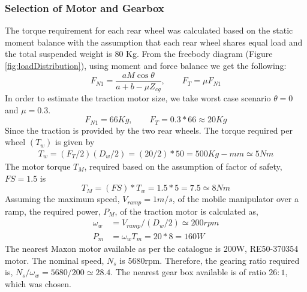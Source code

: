  \subsubsection {Selection of Motor and Gearbox}
 The torque requirement for each rear wheel was calculated based on the static moment balance with the assumption that each rear wheel shares equal load and the total suspended weight is 80 Kg. From the freebody diagram (Figure   \ref{fig:loadDistribution}), using moment and force balance  we get the following:
\begin{equation}
\label{eqn:t1}
F_{N1}=\frac{a M \cos \theta}{a+b-\mu Z_{cg}} , \quad \quad
F_T=\mu F_{N1}
\end{equation}
In order to estimate the traction motor size, we take worst case scenario $\theta=0$ and $\mu =0.3$.
\begin{equation*}
F_{N1}=66 Kg, \quad\quad F_T=0.3*66 \approx 20Kg
\end{equation*}
 Since the traction is provided by the two rear wheels. The torque required per wheel $(T_w)$ is given by
\begin{eqnarray}
T_w=(F_T/2)(D_w/2)= (20/2)*50=500 Kg-mm \simeq 5 Nm
\end{eqnarray}
The motor torque $T_M$, required based on the assumption of factor of safety, $FS=1.5$ is
\begin{equation}
T_M=(FS)*T_w=1.5*5 =7.5 \simeq 8Nm
\end{equation}
 Assuming the maximum speed, $V_{ramp}=1m/s$, of the mobile manipulator over a ramp, the required power, $P_M$, of the traction motor is calculated as,
 \begin{equation}
 \begin{aligned}
\omega_w&=V_{ramp}/(D_w/2) \simeq 200rpm\\
P_m&=\omega_w T_m=20*8=160W
 \end{aligned}
 \end{equation}
 The nearest Maxon motor available as per the catalogue \cite{catMaxon} is 200W,  RE50-370354 motor.  The nominal speed, $N_s$ is 5680rpm. Therefore, the  gearing  ratio required is, $N_s/\omega_w=5680/200 \simeq 28.4$. The nearest gear box available  is of ratio $26:1$, which was chosen. 

